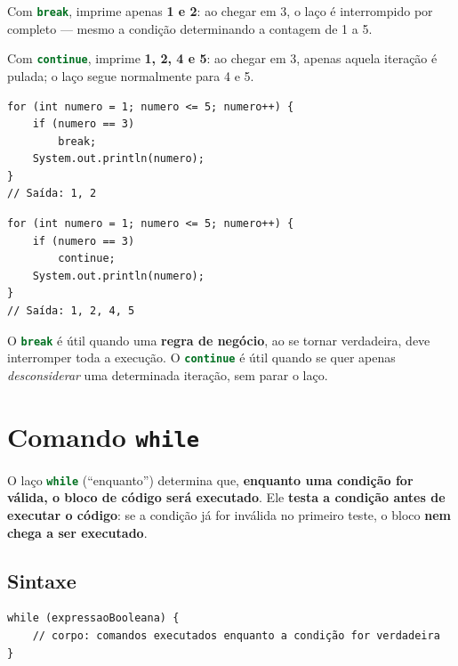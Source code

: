 \documentclass[12pt,a4paper]{article}
\newcommand{\codigo}[1]{\lstinline[language=Java,basicstyle=\ttfamily\small]|#1|}
\begin{document}
\begin{solucao}
Com \codigo{break}, imprime apenas \textbf{1 e 2}: ao chegar em 3, o laço é
interrompido por completo --- mesmo a condição determinando a contagem de 1 a 5.

Com \codigo{continue}, imprime \textbf{1, 2, 4 e 5}: ao chegar em 3, apenas
aquela iteração é pulada; o laço segue normalmente para 4 e 5.

\begin{lstlisting}[caption={Com \texttt{break}}]
for (int numero = 1; numero <= 5; numero++) {
    if (numero == 3)
        break;
    System.out.println(numero);
}
// Saída: 1, 2
\end{lstlisting}

\begin{lstlisting}[caption={Com \texttt{continue}}]
for (int numero = 1; numero <= 5; numero++) {
    if (numero == 3)
        continue;
    System.out.println(numero);
}
// Saída: 1, 2, 4, 5
\end{lstlisting}
\end{solucao}

\begin{observacao}
O \codigo{break} é útil quando uma \textbf{regra de negócio}, ao se tornar
verdadeira, deve interromper toda a execução. O \codigo{continue} é útil quando se
quer apenas \emph{desconsiderar} uma determinada iteração, sem parar o laço.
\end{observacao}

\section{Comando \texttt{while}}

O laço \codigo{while} (``enquanto'') determina que, \textbf{enquanto uma condição
for válida, o bloco de código será executado}. Ele \textbf{testa a condição antes
de executar o código}: se a condição já for inválida no primeiro teste, o bloco
\textbf{nem chega a ser executado}.

\subsection{Sintaxe}

\begin{lstlisting}[caption={Estrutura do \texttt{while}}]
while (expressaoBooleana) {
    // corpo: comandos executados enquanto a condição for verdadeira
}
\end{lstlisting}
\end{document}
